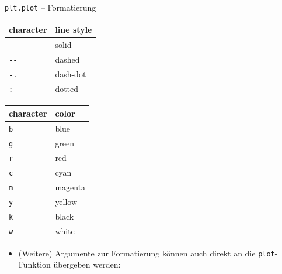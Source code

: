 \documentclass[utf8, smaller, c]{beamer}
\renewcommand{\tt}[1]{{\texttt{#1}}}
\begin{document}
\begin{frame}{\tt{plt.plot} -- Formatierung}
	\pagebreak
	
	\vspace*{-2mm}
	\begin{minipage}{0.45\textwidth}
		\begin{tabular}{|l|l|} \hline
		\textbf{character} & \textbf{line style} \\ \hline
		\verb|-| & solid \\ \hline
		\verb|--| & dashed \\ \hline
		\verb|-.| & dash-dot \\ \hline
		\verb|:| & dotted \\ \hline
		\end{tabular}
	\end{minipage}
	\begin{minipage}{0.45\textwidth}
		\begin{tabular}{|l|l|} \hline
		\textbf{character} & \textbf{color} \\ \hline
		\verb|b| & blue \\ \hline
		\verb|g| & green \\ \hline
		\verb|r| & red \\ \hline
		\verb|c| & cyan \\ \hline
		\verb|m| & magenta \\ \hline
		\verb|y| & yellow \\ \hline
		\verb|k| & black \\ \hline
		\verb|w| & white \\ \hline
		\end{tabular}
	\end{minipage}
	
	\pagebreak
	
	\vspace*{-2mm}
	\begin{itemize}
		\item (Weitere) Argumente zur Formatierung können auch direkt an die \tt{plot}-Funktion übergeben werden:
	\end{itemize}
	

\end{frame}
\end{document}
